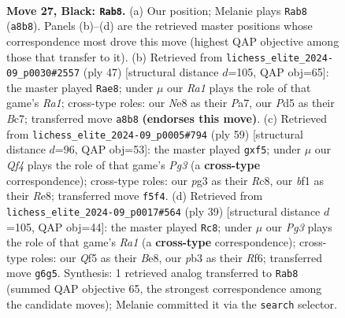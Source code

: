 \documentclass[11pt]{article}
\begin{document}
\clearpage

\begin{figure}[p]\centering
\begin{subfigure}{0.46\textwidth}\centering
\resizebox{\linewidth}{!}{%
\newchessgame
\chessboard[
  setfen={r2rn1k1/p1p2p2/6p1/2Pp1q1p/5P2/1P2P1P1/3BR2P/Q3KBR1 b - - 1 27},
  showmover=false,
  pgfstyle=straightmove, color=movearrow, markmove={a8-b8}
]}
\caption{}
\end{subfigure}\hfill
\begin{subfigure}{0.46\textwidth}\centering
\resizebox{\linewidth}{!}{%
\newchessgame
\chessboard[
  setfen={r5k1/ppb1rpp1/2p3p1/3q4/3Pp3/2P3P1/PP3PB1/R1BQR1K1 b - - 1 24},
  showmover=false,
  pgfstyle=straightmove, color=movearrow, markmove={a8-e8}
]}
\caption{}
\end{subfigure}
\\[4pt]
\begin{subfigure}{0.46\textwidth}\centering
\resizebox{\linewidth}{!}{%
\newchessgame
\chessboard[
  setfen={2r1r2k/p6p/1q3bp1/2p1pP2/4Q1P1/2P4P/PP1R2B1/3R3K b - - 0 30},
  showmover=false,
  pgfstyle=straightmove, color=movearrow, markmove={g6-f5}
]}
\caption{}
\end{subfigure}\hfill
\begin{subfigure}{0.46\textwidth}\centering
\resizebox{\linewidth}{!}{%
\newchessgame
\chessboard[
  setfen={r3b1k1/p1q3p1/2Pp1r1p/2p2p2/Q7/P2PP1P1/5PBP/R4RK1 b - - 2 20},
  showmover=false,
  pgfstyle=straightmove, color=movearrow, markmove={a8-c8}
]}
\caption{}
\end{subfigure}
\caption{\textbf{Move 27, Black: \texttt{Rab8}.} (a) Our position; Melanie plays \texttt{Rab8} (\texttt{a8b8}). Panels (b)--(d) are the retrieved master positions whose correspondence most drove this move (highest QAP objective among those that transfer to it). (b) Retrieved from \texttt{lichess\_elite\_2024-09\_p0030\#2557} (ply 47) [structural distance $d$=105, QAP obj=65]: the master played \texttt{Rae8}; under $\mu$ our \emph{Ra1} plays the role of that game's \emph{Ra1}; cross-type roles: our \emph{N}e8 as their \emph{P}a7, our \emph{P}d5 as their \emph{B}c7; transferred move \texttt{a8b8} \textbf{(endorses this move)}. (c) Retrieved from \texttt{lichess\_elite\_2024-09\_p0005\#794} (ply 59) [structural distance $d$=96, QAP obj=53]: the master played \texttt{gxf5}; under $\mu$ our \emph{Qf4} plays the role of that game's \emph{Pg3} (a \textbf{cross-type} correspondence); cross-type roles: our \emph{p}g3 as their \emph{R}c8, our \emph{b}f1 as their \emph{R}e8; transferred move \texttt{f5f4}. (d) Retrieved from \texttt{lichess\_elite\_2024-09\_p0017\#564} (ply 39) [structural distance $d$=105, QAP obj=44]: the master played \texttt{Rc8}; under $\mu$ our \emph{Pg3} plays the role of that game's \emph{Ra1} (a \textbf{cross-type} correspondence); cross-type roles: our \emph{Q}f5 as their \emph{B}e8, our \emph{p}b3 as their \emph{R}f6; transferred move \texttt{g6g5}. Synthesis: 1 retrieved analog transferred to \texttt{Rab8} (summed QAP objective 65, the strongest correspondence among the candidate moves); Melanie committed it via the \texttt{search} selector.}
\label{fig:thought-m53}
\end{figure}
\end{document}

